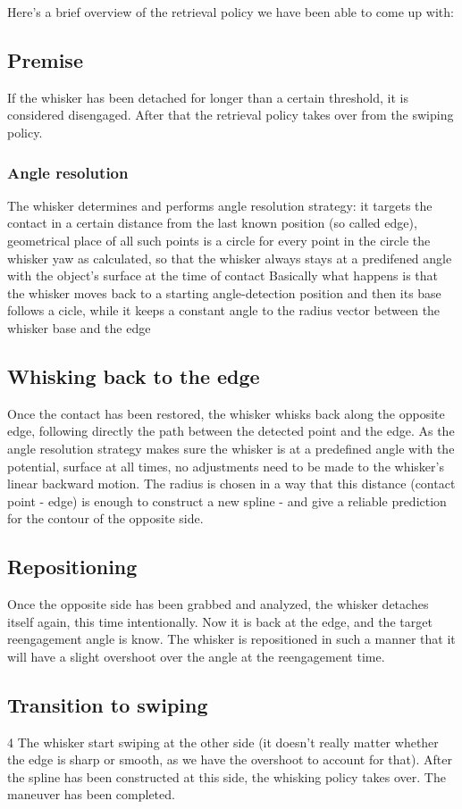 Here's a brief overview of the retrieval policy we have been able to come up with:
\subsection{Premise}
If the whisker has been detached for longer than a certain threshold, it is considered disengaged.
After that the retrieval policy takes over from the swiping policy.

\subsubsection{Angle resolution}
The whisker determines and performs angle resolution strategy:
it targets the contact in a certain distance from the last known position (so called edge), geometrical place of all such points is a circle
for every point in the circle the whisker yaw as calculated, so that the whisker always stays at a predifened angle with the object's surface at the time of contact
Basically what happens is that the whisker moves back to a starting angle-detection position and then its base follows a cicle, while it keeps a constant angle to the radius vector between the whisker base and the edge

\subsection{Whisking back to the edge}
Once the contact has been restored, the whisker whisks back along the opposite edge, following directly the path between the detected point and the edge.
As the angle resolution strategy makes sure the whisker is at a predefined angle with the potential, surface at all times, no adjustments need to be made to the whisker's linear backward motion.
The radius is chosen in a way that this distance (contact point - edge) is enough to construct a new spline - and give a reliable prediction for the contour of the opposite side.

\subsection{Repositioning}
Once the opposite side has been grabbed and analyzed, the whisker detaches itself again, this time intentionally. Now it is back at the edge, and the target reengagement angle is know.
The whisker is repositioned in such a manner that it will have a slight overshoot over the angle at the reengagement time.

\subsection{Transition to swiping}
4 The whisker start swiping at the other side (it doesn't really matter whether the edge is sharp or smooth, as we have the overshoot to account for that).
After the spline has been constructed at this side, the whisking policy takes over. The maneuver has been completed.



